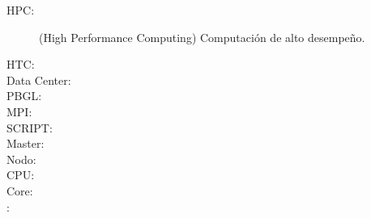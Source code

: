 \begin{description}
	\item [HPC:] (High Performance Computing) Computación de alto desempeño.
	\item [HTC:]
	\item [Data Center:]
	\item [PBGL:]
	\item [MPI:]
	\item [SCRIPT:]
	\item [Master:]
	\item [Nodo:]
	\item [CPU:]
	\item [Core:]
	\item [:]
\end{description}